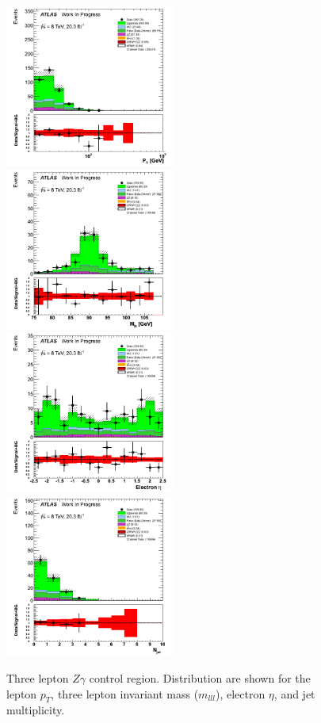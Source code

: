 \begin{figure}[htp]
\centering
\includegraphics[width=0.495\textwidth]{figures/ZG_CR/AllLeptonPt_histratio.png}
\includegraphics[width=0.495\textwidth]{figures/ZG_CR/InvariantMassThreeLep_histratio.png}
\includegraphics[width=0.495\textwidth]{figures/ZG_CR/ElectronEta_histratio.png}
\includegraphics[width=0.495\textwidth]{figures/ZG_CR/NJets_histratio.png}

\caption{Three lepton $Z\gamma$ control region. Distribution are shown for the
lepton $p_{T}$, three lepton invariant mass ($m_{lll}$), electron $\eta$, 
and jet multiplicity.}
\label{fig:Zgamma_CR}
\end{figure}  


